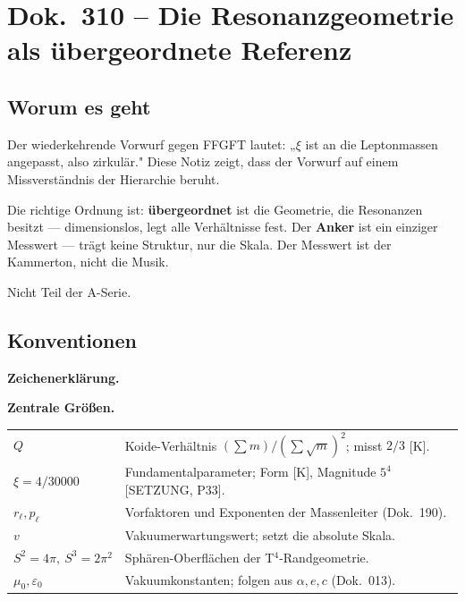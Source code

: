 \maketitle
\tableofcontents

\chapter*{Dok.~310 -- Die Resonanzgeometrie als übergeordnete Referenz}

\section*{Worum es geht}

Der wiederkehrende Vorwurf gegen FFGFT lautet: „$\xi$ ist an die
Leptonmassen angepasst, also zirkulär." Diese Notiz zeigt, dass der
Vorwurf auf einem Missverständnis der Hierarchie beruht.

Die richtige Ordnung ist: \textbf{übergeordnet} ist die Geometrie, die
Resonanzen besitzt — dimensionslos, legt alle Verhältnisse fest.
Der \textbf{Anker} ist ein einziger Messwert — trägt keine Struktur,
nur die Skala. Der Messwert ist der Kammerton, nicht die Musik.

Nicht Teil der A-Serie.

\section*{Konventionen}

\noindent\textbf{Zeichenerklärung.}

\medskip


\medskip
\noindent\textbf{Zentrale Größen.}

\medskip
\begin{tabular}{@{}lp{10.5cm}}
$Q$ & Koide-Verhältnis $(\sum m)/(\sum\sqrt m)^2$; misst $2/3$ [K]. \\[4pt]
$\xi = 4/30000$ & Fundamentalparameter; Form [K], Magnitude $5^4$ [SETZUNG, P33]. \\[4pt]
$r_\ell, p_\ell$ & Vorfaktoren und Exponenten der Massenleiter (Dok.~190). \\[4pt]
$v$ & Vakuumerwartungswert; setzt die absolute Skala. \\[4pt]
$S^2 = 4\pi,\ S^3 = 2\pi^2$ & Sphären-Oberflächen der T$^4$-Randgeometrie. \\[4pt]
$\mu_0,\varepsilon_0$ & Vakuumkonstanten; folgen aus $\alpha,e,c$ (Dok.~013). \\
\end{tabular}

